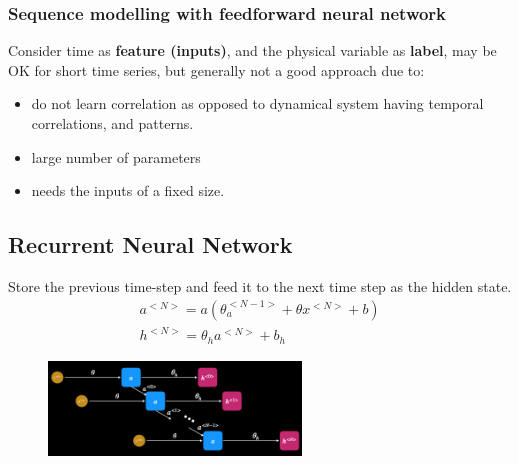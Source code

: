 \documentclass[a4paper,10pt]{article}
\begin{document}
\subsubsection{Sequence modelling with feedforward neural network}
Consider time as \textbf{feature (inputs)}, and the physical variable as \textbf{label}, may be OK for short time series, but generally not a good approach due to:
\begin{itemize}
    \item do not learn correlation as opposed to dynamical system having temporal correlations, and patterns. 
    \item large number of parameters
    \item needs the inputs of a fixed size. 
\end{itemize}

\subsection{Recurrent Neural Network}
Store the previous time-step and feed it to the next time step as the hidden state.
\vspace*{0.3cm}
\begin{gather*}
    a^{<N>} = a(\theta_a^{<N-1>}+\theta x^{<N>}+b)\\
    h^{<N>} = \theta_ha^{<N>}+b_h
\end{gather*}

\vspace*{-0.3cm}
\begin{figure}[ht]
    \centering
    \includegraphics[width =0.6\textwidth]{RC.png}
\end{figure}
\end{document}
